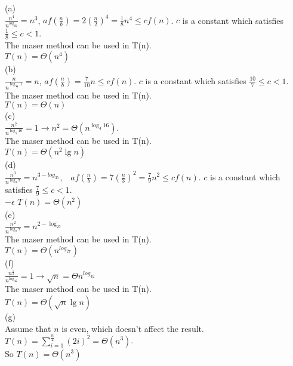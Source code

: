 \documentclass[a4paper, justified]{tufte-handout}
\begin{document}
\begin{solution}
(a)\\
$\frac{n^4}{n^{\log_22}}=n^3$, $af(\frac{n}{b})=2(\frac{n}{2})^4=\frac{1}{8}n^4\leq cf(n)$. $c$ is a constant which satisfies $\frac{1}{8}\leq c<1$.\\
The maser method can be used in T(n).\\ 
$T(n)=\Theta(n^4)$\\

\noindent(b)\\
$\frac{n}{n^{\log_{\frac{10}{7}} 1}}=n$, $af(\frac{n}{b})=\frac{7}{10}n\leq cf(n)$. $c$ is a constant which satisfies $\frac{10}{7}\leq c<1$.\\
The maser method can be used in T(n).\\
$T(n)=\Theta(n)$\\

\noindent(c)\\
$\frac{n^2}{n^{\log_{4}16}}=1\to n^2=\Theta(n^{\log_4{16}})$.\\
The maser method can be used in T(n).\\
$T(n)=\Theta(n^2\lg n)$\\

\noindent(d)\\
$\frac{n^3}{n^{\log_{3}7}}=n^{3-log_37}$,$\quad af(\frac{n}{b})=7(\frac{n}{3})^2=\frac{7}{9}n^2\leq cf(n)$. $c$ is a constant which satisfies $\frac{7}{9}\leq c<1$.\\
$-\epsilon$
$T(n)=\Theta(n^2)$\\

\noindent(e)\\
$\frac{n^2}{n^{\log_{2}7}}=n^{2-\log_27}$\\
The maser method can be used in T(n).\\
$T(n)=\Theta(n^{log_27})$\\

\noindent(f)\\
$\frac{n^{\frac{1}{2}}}{n^{\log_42}}=1\to \sqrt{n}=\Theta{n^{log_42}}$\\
The maser method can be used in T(n).\\
$T(n)=\Theta(\sqrt{n}\lg n)$\\

\noindent(g)\\
Assume that $n$ is even, which doesn't affect the result.\\
$T(n)=\sum\limits_{i=1}^{\frac{n}{2}}(2i)^2=\Theta(n^3)$.\\
So $T(n)=\Theta(n^3)$
\end{solution}
\end{document}
